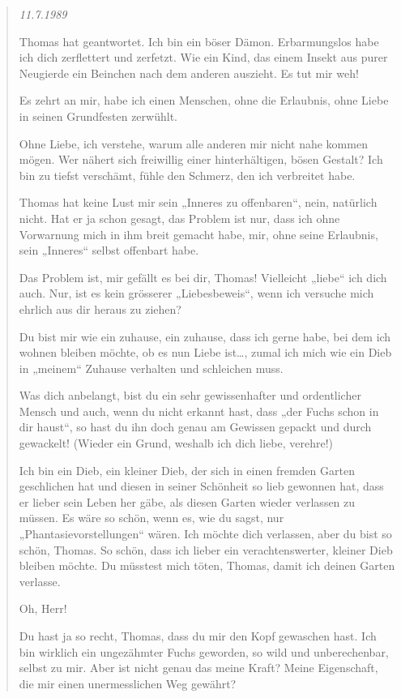 \documentclass[10pt,titlepage,a5paper]{book}
\newenvironment{tg}{\begin{quote}\em}{\end{quote}}
\begin{document}
\begin{tg}
11.7.1989

Thomas hat geantwortet. Ich bin ein böser Dämon. Erbarmungslos habe ich dich zerflettert und zerfetzt. Wie ein Kind, das einem Insekt aus purer Neugierde ein Beinchen nach dem anderen auszieht. Es tut mir weh!

Es zehrt an mir, habe ich einen Menschen, ohne die Erlaubnis, ohne Liebe in seinen Grundfesten zerwühlt.

Ohne Liebe, ich verstehe, warum alle anderen mir nicht nahe kommen mögen. Wer nähert sich freiwillig einer hinterhältigen, bösen Gestalt? Ich bin zu tiefst verschämt, fühle den Schmerz, den ich verbreitet habe. 

Thomas hat keine Lust mir sein „Inneres zu offenbaren“, nein, natürlich nicht. Hat er ja schon gesagt, das Problem ist nur, dass ich ohne Vorwarnung mich in ihm breit gemacht habe, mir, ohne seine Erlaubnis, sein „Inneres“ selbst offenbart habe.

Das Problem ist, mir gefällt es bei dir, Thomas! Vielleicht „liebe“ ich dich auch. Nur, ist es kein grösserer „Liebesbeweis“, wenn ich versuche mich ehrlich aus dir heraus zu ziehen?

Du bist mir wie ein zuhause, ein zuhause, dass ich gerne habe, bei dem ich wohnen bleiben möchte, ob es nun Liebe ist\dots , zumal ich mich wie ein Dieb in „meinem“ Zuhause verhalten und schleichen muss.

Was dich anbelangt, bist du ein sehr gewissenhafter und ordentlicher Mensch und auch, wenn du nicht erkannt hast, dass „der Fuchs schon in dir haust“, so hast du ihn doch genau am Gewissen gepackt und durch gewackelt! (Wieder ein Grund, weshalb ich dich liebe, verehre!)

Ich bin ein Dieb, ein kleiner Dieb, der sich in einen fremden Garten geschlichen hat und diesen in seiner Schönheit so lieb gewonnen hat, dass er lieber sein Leben her gäbe, als diesen Garten wieder verlassen zu müssen. Es wäre so schön, wenn es, wie du sagst, nur „Phantasievorstellungen“ wären. Ich möchte dich verlassen, aber du bist so schön, Thomas. So schön, dass ich lieber ein verachtenswerter, kleiner Dieb bleiben möchte. Du müsstest mich töten, Thomas, damit ich deinen Garten verlasse.

Oh, Herr!

Du hast ja so recht, Thomas, dass du mir den Kopf gewaschen hast. 
 Ich bin wirklich ein ungezähmter Fuchs geworden, so wild und unberechenbar, selbst zu mir. Aber ist nicht genau das meine Kraft? Meine Eigenschaft, die mir einen unermesslichen Weg gewährt?
 

\end{tg}
\end{document}
